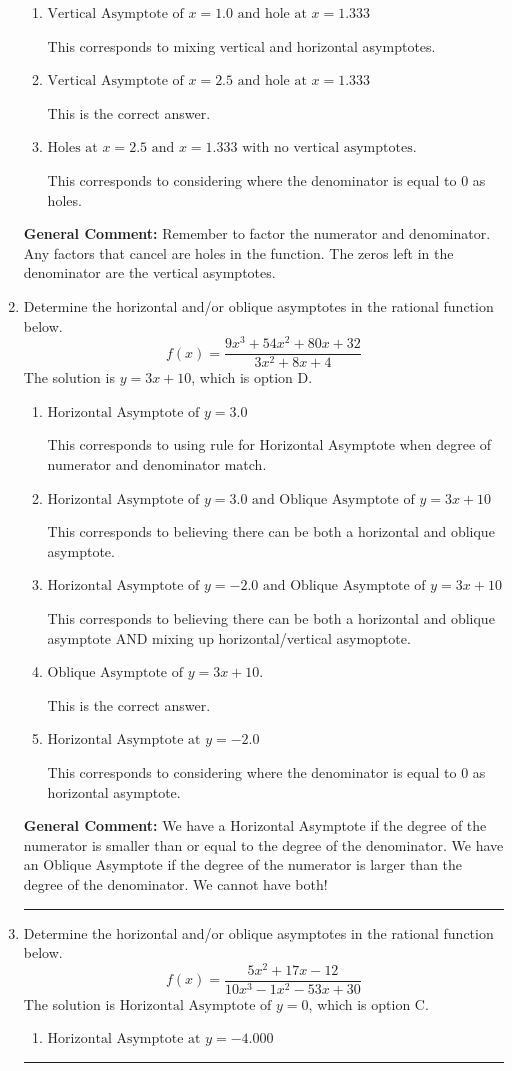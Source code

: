 \documentclass{extbook}[14pt]
\newcommand{\litem}[1]{\item #1

\rule{\textwidth}{0.4pt}}
\begin{document}
\begin{enumerate}
{\begin{enumerate}[label=\Alph*.]
This corresponds to setting the numerator equal to 0.
\item \( \text{Vertical Asymptote of } x = 1.0 \text{ and hole at } x = 1.333 \)

This corresponds to mixing vertical and horizontal asymptotes.
\item \( \text{Vertical Asymptote of } x = 2.5 \text{ and hole at } x = 1.333 \)

This is the correct answer.
\item \( \text{Holes at } x = 2.5 \text{ and } x = 1.333 \text{ with no vertical asymptotes.} \)

This corresponds to considering where the denominator is equal to 0 as holes.
\end{enumerate}

\textbf{General Comment:} Remember to factor the numerator and denominator. Any factors that cancel are holes in the function. The zeros left in the denominator are the vertical asymptotes.
}
\litem{
Determine the horizontal and/or oblique asymptotes in the rational function below.
\[ f(x) = \frac{9x^{3} +54 x^{2} +80 x + 32}{3x^{2} +8 x + 4} \]The solution is \( y = 3x + 10 \), which is option D.\begin{enumerate}[label=\Alph*.]
\item \( \text{Horizontal Asymptote of } y = 3.0  \)

This corresponds to using rule for Horizontal Asymptote when degree of numerator and denominator match.
\item \( \text{Horizontal Asymptote of } y = 3.0 \text{ and Oblique Asymptote of } y = 3x + 10 \)

This corresponds to believing there can be both a horizontal and oblique asymptote.
\item \( \text{Horizontal Asymptote of } y = -2.0 \text{ and Oblique Asymptote of } y = 3x + 10 \)

This corresponds to believing there can be both a horizontal and oblique asymptote AND mixing up horizontal/vertical asymoptote.
\item \( \text{Oblique Asymptote of } y = 3x + 10. \)

This is the correct answer.
\item \( \text{Horizontal Asymptote at } y = -2.0 \)

This corresponds to considering where the denominator is equal to 0 as horizontal asymptote.
\end{enumerate}

\textbf{General Comment:} We have a Horizontal Asymptote if the degree of the numerator is smaller than or equal to the degree of the denominator. We have an Oblique Asymptote if the degree of the numerator is larger than the degree of the denominator. We cannot have both!
}
\litem{
Determine the horizontal and/or oblique asymptotes in the rational function below.
\[ f(x) = \frac{5x^{2} +17 x -12}{10x^{3} -1 x^{2} -53 x + 30} \]The solution is \( \text{Horizontal Asymptote of } y = 0 \), which is option C.\begin{enumerate}[label=\Alph*.]
\item \( \text{Horizontal Asymptote at } y = -4.000 \)


\end{enumerate}}
\end{enumerate}
\end{document}
